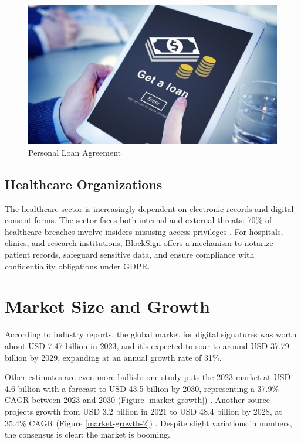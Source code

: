 \begin{figure}[H]
    \centering
    \includegraphics[width=18cm]{"images/loan-agreement.jpg"}
    \caption{Personal Loan Agreement}
    \label{loan-agreement}
\end{figure}

\subsection{Healthcare Organizations} 
The healthcare sector is increasingly dependent on electronic records and digital  consent forms. The sector faces both internal and external threats: 70\% of healthcare  breaches involve insiders misusing access privileges \cite{kadir_canoz_use_nodate}. For hospitals, clinics, and research institutions, BlockSign offers a mechanism to notarize patient records, safeguard sensitive data, and ensure compliance with confidentiality obligations under GDPR. 


\section{Market Size and Growth}
According to industry reports, the global market for digital signatures was worth about USD 7.47 billion in 2023, and it’s expected to soar to around USD 37.79 billion by 2029, expanding at an annual growth rate of 31\%. 

Other estimates are even more bullish: one study puts the 2023 market at USD 4.6 billion with a forecast to USD 43.5 billion by 2030, representing a 37.9\% CAGR between 2023 and 2030 (Figure \ref{market-growth}) \cite{grand_view_horizon_global_nodate}. Another source projects growth from USD 3.2 billion in 2021 to USD 48.4 billion by 2028, at 35.4\% CAGR (Figure \ref{market-growth-2}) \cite{acumen_digital_nodate}. Despite slight variations in numbers, the consensus is clear: the market is booming.


